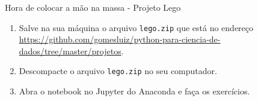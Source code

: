 \begin{frame}[t, fragile]{Hora de colocar a mão na massa - Projeto Lego}
  \begin{enumerate}
  \item Salve na sua máquina o arquivo \verb!lego.zip! que está no endereço \url{https://github.com/gomesluiz/python-para-ciencia-de-dados/tree/master/projetos}.
  \item Descompacte o arquivo \verb!lego.zip! no seu computador.
  \item Abra o notebook no Jupyter do Anaconda e faça os exercícios.
  \end{enumerate}
\end{frame}